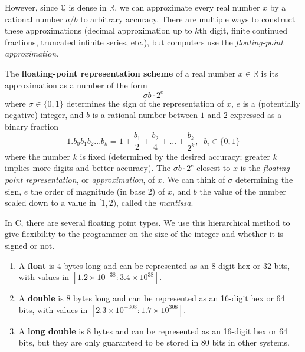   However, since $\mathbb{Q}$ is dense in $\mathbb{R}$, we can approximate every real number $x$ by a rational number $a/b$ to arbitrary accuracy. There are multiple ways to construct these approximations (decimal approximation up to $k$th digit, finite continued fractions, truncated infinite series, etc.), but computers use the \textit{floating-point approximation}. 

  \begin{definition}
    The \textbf{floating-point representation scheme} of a real number $x \in \mathbb{R}$ is its approximation as a number of the form 
    \[\sigma b \cdot 2^e\]
    where $\sigma \in \{0, 1\}$ determines the sign of the representation of $x$, $e$ is a (potentially negative) integer, and $b$ is a rational number between $1$ and $2$ expressed as a binary fraction 
    \[1.b_0 b_1 b_2 ... b_k = 1 + \frac{b_1}{2} + \frac{b_2}{4} + ... + \frac{b_k}{2^k}, \;\; b_i \in \{0,1\}\]
    where the number $k$ is fixed (determined by the desired accuracy; greater $k$ implies more digits and better accuracy). The $\sigma b \cdot 2^e$ closest to $x$ is the \textit{floating-point representation}, or \textit{approximation}, of $x$. We can think of $\sigma$ determining the sign, $e$ the order of magnitude (in base 2) of $x$, and $b$ the value of the number scaled down to a value in $[1,2)$, called the \textit{mantissa}. 
  \end{definition}

  \begin{definition}
    In C, there are several floating point types. We use this hierarchical method to give flexibility to the programmer on the size of the integer and whether it is signed or not. 
    \begin{enumerate} 
      \item A \textbf{float} is 4 bytes long and can be represented as an 8-digit hex or 32 bits, with values in $[1.2 \times 10^{-38}: 3.4 \times 10^{38}]$. 
      \item A \textbf{double} is 8 bytes long and can be represented as an 16-digit hex or 64 bits, with values in $[2.3 \times 10^{-308}: 1.7 \times 10^{308}]$. 
      \item A \textbf{long double} is 8 bytes and can be represented as an 16-digit hex or 64 bits, but they are only guaranteed to be stored in 80 bits in other systems. 
    \end{enumerate}
  \end{definition}

